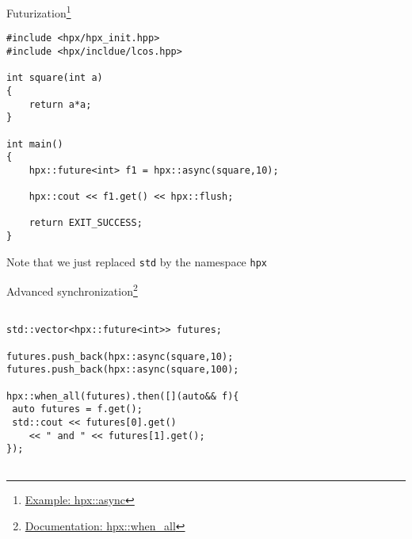 \documentclass[12pt,t]{beamer}
\begin{document}
\begin{frame}[fragile]{Futurization\footnote{\tiny\href{https://stellar-group.github.io/hpx/docs/sphinx/latest/html/examples/fibonacci_local.html?highlight=async}{Example: hpx::async}}}

\begin{lstlisting}
#include <hpx/hpx_init.hpp>
#include <hpx/incldue/lcos.hpp>

int square(int a)
{ 
    return a*a; 
}

int main()
{
    hpx::future<int> f1 = hpx::async(square,10); 
    
    hpx::cout << f1.get() << hpx::flush;
    
    return EXIT_SUCCESS;
}

\end{lstlisting}
\vspace{-0.25cm}
\begin{center}
Note that we just replaced \lstinline|std| by the namespace \lstinline|hpx|
\end{center}
\end{frame}


\begin{frame}[fragile]{Advanced synchronization\footnote{\tiny\href{https://stellar-group.github.io/hpx/docs/sphinx/latest/html/api.html?highlight=when_all\#_CPPv4IDpEN3hpx8when_allE6futureI5tupleIDp6futureI1TEEEDpRR1T}{Documentation: hpx::when\_all}}}

\begin{lstlisting}

std::vector<hpx::future<int>> futures;

futures.push_back(hpx::async(square,10);
futures.push_back(hpx::async(square,100);

hpx::when_all(futures).then([](auto&& f){
 auto futures = f.get();
 std::cout << futures[0].get() 
 	<< " and " << futures[1].get();
});


\end{lstlisting}

\end{frame}
\end{document}
